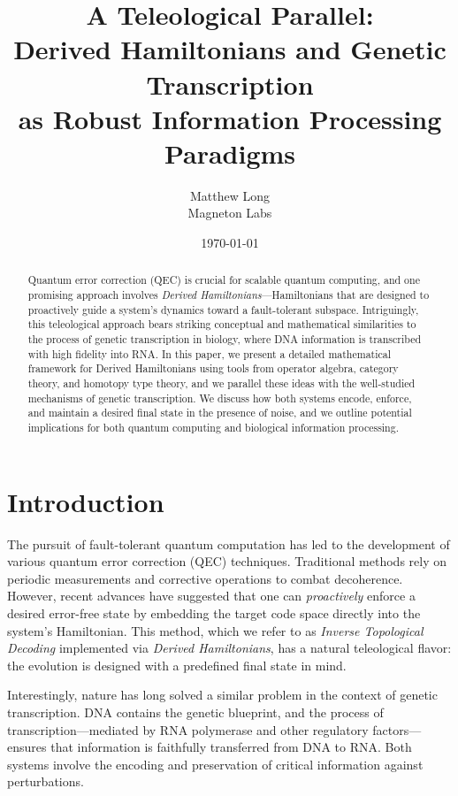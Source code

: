 \documentclass[11pt]{article}
\title{\textbf{A Teleological Parallel: \\ Derived Hamiltonians and Genetic Transcription \\ as Robust Information Processing Paradigms}}
\author{Matthew Long \\
Magneton Labs}
\date{\today}
\begin{document}
\maketitle

\begin{abstract}
Quantum error correction (QEC) is crucial for scalable quantum computing, and one promising approach involves \emph{Derived Hamiltonians}---Hamiltonians that are designed to proactively guide a system's dynamics toward a fault-tolerant subspace. Intriguingly, this teleological approach bears striking conceptual and mathematical similarities to the process of genetic transcription in biology, where DNA information is transcribed with high fidelity into RNA. In this paper, we present a detailed mathematical framework for Derived Hamiltonians using tools from operator algebra, category theory, and homotopy type theory, and we parallel these ideas with the well-studied mechanisms of genetic transcription. We discuss how both systems encode, enforce, and maintain a desired final state in the presence of noise, and we outline potential implications for both quantum computing and biological information processing.
\end{abstract}

\tableofcontents

\section{Introduction}
The pursuit of fault-tolerant quantum computation has led to the development of various quantum error correction (QEC) techniques. Traditional methods rely on periodic measurements and corrective operations to combat decoherence. However, recent advances have suggested that one can \emph{proactively} enforce a desired error-free state by embedding the target code space directly into the system's Hamiltonian. This method, which we refer to as \emph{Inverse Topological Decoding} implemented via \emph{Derived Hamiltonians}, has a natural teleological flavor: the evolution is designed with a predefined final state in mind.

Interestingly, nature has long solved a similar problem in the context of genetic transcription. DNA contains the genetic blueprint, and the process of transcription—mediated by RNA polymerase and other regulatory factors—ensures that information is faithfully transferred from DNA to RNA. Both systems involve the encoding and preservation of critical information against perturbations.
\end{document}
